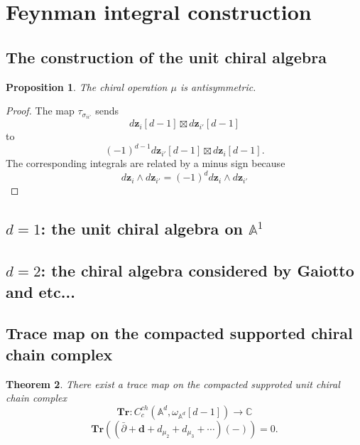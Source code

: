 \documentclass[11pt]{amsart}
\newtheorem{thm}{Theorem}[section]
\newtheorem{prop}[thm]{Proposition}
\theoremstyle{definition}
\theoremstyle{remark}
\numberwithin{equation}{section}
\begin{document}
\iffalse
\subsection{The chiral chain complex}

The differential $d_{\mathcal{A}}$ and higher chiral operations $\{\mu_n\}$ can be made into a differential
$$
\mathbf{d}+d_{\mathcal{A}}+d_{\mu_2}+d_{\mu_3}+\cdots+
$$
\fi
\section{Feynman integral construction}

\subsection{The construction of the unit chiral algebra}

\begin{prop}
    The chiral operation $\mu$ is antisymmetric.
\end{prop}

\begin{proof}
    The map $\tau_{\sigma_{ii'}}$ sends
    $$
    \boxed{d\mathbf{z}_i[d-1]}\boxtimes  \boxed{d\mathbf{z}_{i'}[d-1]}
    $$
    to
    $$
(-1)^{d-1}\boxed{d\mathbf{z}_{i'}[d-1]}\boxtimes  \boxed{d\mathbf{z}_{i}[d-1]}.
    $$
    The corresponding integrals are related  by a minus sign because
    $$
d\mathbf{z}_{i}\wedge    d\mathbf{z}_{i'}=(-1)^dd\mathbf{z}_{i}\wedge d\mathbf{z}_{i'}
    $$
\end{proof}

\subsection{$d=1$: the unit chiral algebra on $\mathbb{A}^1$}



\subsection{$d=2$: the chiral algebra considered by Gaiotto and etc...}


\iffalse
\subsection{Trace map on the compacted supported chiral chain complex}

\begin{thm}
    There exist a trace map on the compacted supproted unit chiral chain complex
    $$
    \mathbf{Tr}:C^{ch}_c(\mathbb{A}^d,\omega_{\mathbb{A}^d}[d-1])\rightarrow\mathbb{C}
    $$
    $$
    \mathbf{Tr}\left((\bar{\partial}+\mathbf{d}+d_{\mu_2}+d_{\mu_3}+\cdots)(-)\right)=0.
    $$
\end{thm}
\end{document}
